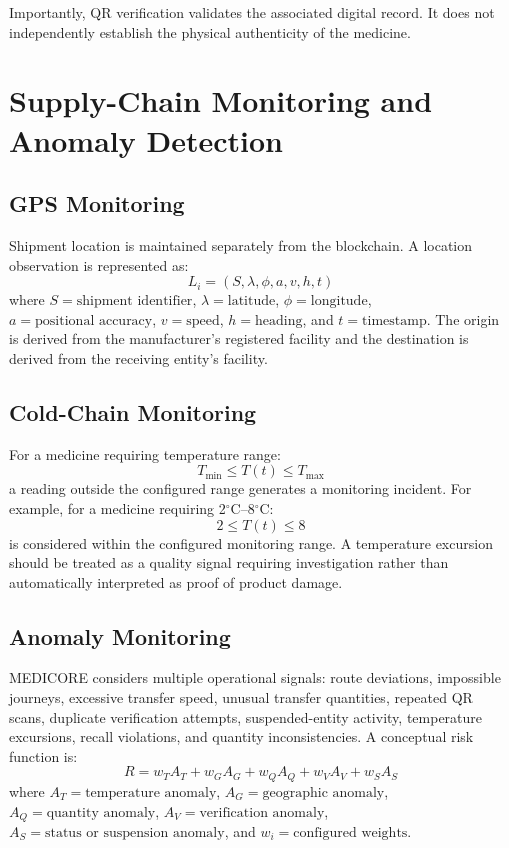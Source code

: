 \documentclass[11pt,a4paper]{article}
\begin{document}
Importantly, QR verification validates the associated digital record. It does not independently establish the physical authenticity of the medicine.

\section{Supply-Chain Monitoring and Anomaly Detection}

\subsection{GPS Monitoring}
Shipment location is maintained separately from the blockchain. A location observation is represented as:
\begin{equation}
L_i = (S, \lambda, \phi, a, v, h, t)
\end{equation}
where $S = \text{shipment identifier}$, $\lambda = \text{latitude}$, $\phi = \text{longitude}$, $a = \text{positional accuracy}$, $v = \text{speed}$, $h = \text{heading}$, and $t = \text{timestamp}$. The origin is derived from the manufacturer's registered facility and the destination is derived from the receiving entity's facility.

\subsection{Cold-Chain Monitoring}
For a medicine requiring temperature range:
\begin{equation}
T_{\min} \le T(t) \le T_{\max}
\end{equation}
a reading outside the configured range generates a monitoring incident. For example, for a medicine requiring 2$^\circ$C--8$^\circ$C:
\begin{equation}
2 \le T(t) \le 8
\end{equation}
is considered within the configured monitoring range. A temperature excursion should be treated as a quality signal requiring investigation rather than automatically interpreted as proof of product damage.

\subsection{Anomaly Monitoring}
MEDICORE considers multiple operational signals: route deviations, impossible journeys, excessive transfer speed, unusual transfer quantities, repeated QR scans, duplicate verification attempts, suspended-entity activity, temperature excursions, recall violations, and quantity inconsistencies. A conceptual risk function is:
\begin{equation}
R = w_T A_T + w_G A_G + w_Q A_Q + w_V A_V + w_S A_S
\end{equation}
where $A_T = \text{temperature anomaly}$, $A_G = \text{geographic anomaly}$, $A_Q = \text{quantity anomaly}$, $A_V = \text{verification anomaly}$, $A_S = \text{status or suspension anomaly}$, and $w_i = \text{configured weights}$.
\end{document}

